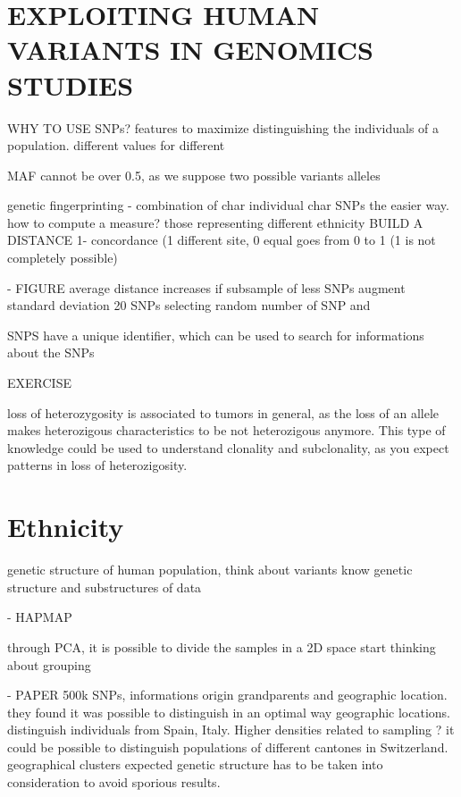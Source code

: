 \chapter{EXPLOITING HUMAN VARIANTS
IN GENOMICS STUDIES}

WHY TO USE SNPs?
features to maximize distinguishing the individuals of a population. different values for different

MAF cannot be over 0.5, as we suppose two possible variants alleles

genetic fingerprinting
- combination of char individual char
 SNPs the easier way.
 how to compute a measure?
 those representing different ethnicity
BUILD A DISTANCE
	1- concordance (1 different site, 0 equal
	goes from 0 to 1 (1 is not completely possible)
	
	- FIGURE
	average distance increases if subsample of less SNPs
	augment standard deviation
	20 SNPs 
	selecting random number of SNP and 
	
	
SNPS have a unique identifier, which can be used to search for informations about the SNPs

EXERCISE

loss of heterozygosity is associated to tumors in general, as the loss of an allele makes heterozigous characteristics to be not heterozigous anymore.
This type of knowledge could be used to understand clonality and subclonality, as you expect patterns in loss of heterozigosity.

\chapter{Ethnicity}
genetic structure of human population, think about variants
know genetic structure and substructures of data

- HAPMAP
	
through PCA, it is possible to divide the samples in a 2D space 
start thinking about grouping

- PAPER
500k SNPs, informations origin grandparents and geographic location.
they found it was possible to distinguish in an optimal way geographic locations.
distinguish individuals from Spain, Italy. Higher densities related to sampling ?
it could be possible to distinguish populations of different cantones in Switzerland.
geographical clusters expected 
genetic structure has to be taken into consideration to avoid sporious results.


